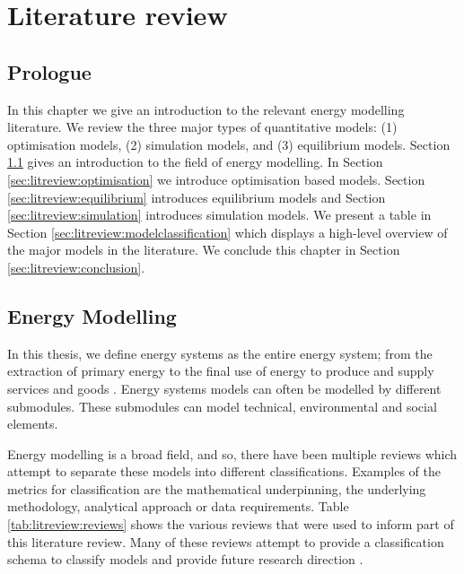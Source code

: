 \chapter{Literature review}
\label{chapter:litreview}
\ifpdf
\graphicspath{{Chapter3/Figs/Raster/}{Chapter3/Figs/PDF/}{Chapter3/Figs/}}
\else
\graphicspath{{Chapter3/Figs/Vector/}{Chapter3/Figs/}}
\fi

\section*{Prologue}

In this chapter we give an introduction to the relevant energy modelling literature. We review the three major types of quantitative models: (1) optimisation models, (2) simulation models, and (3) equilibrium models. Section \ref{sec:litreview:energymodelling} gives an introduction to the field of energy modelling. In Section \ref{sec:litreview:optimisation} we introduce optimisation based models. Section \ref{sec:litreview:equilibrium} introduces equilibrium models and Section \ref{sec:litreview:simulation} introduces simulation models. We present a table in Section \ref{sec:litreview:modelclassification} which displays a high-level overview of the major models in the literature. We conclude this chapter in Section \ref{sec:litreview:conclusion}.

\section{Energy Modelling}
\label{sec:litreview:energymodelling}


In this thesis, we define energy systems as the entire energy system; from the extraction of primary energy to the final use of energy to produce and supply services and goods \cite{Pfenninger2014b}. Energy systems models can often be modelled by different submodules. These submodules can model technical, environmental and social elements.


Energy modelling is a broad field, and so, there have been multiple reviews which attempt to separate these models into different classifications. Examples of the metrics for classification are the mathematical underpinning, the underlying methodology, analytical approach or data requirements. Table \ref{tab:litreview:reviews} shows the various reviews that were used to inform part of this literature review. Many of these reviews attempt to provide a classification schema to classify models \cite{Hall2016a, Savvidis2019a} and provide future research direction \cite{Pfenninger2014b,Savvidis2019a}. 


